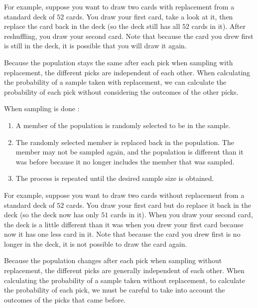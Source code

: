 \documentclass[letterpaper,10pt,english]{jupyterBook}
\begin{document}
\sphinxAtStartPar
For example, suppose you want to draw two cards with replacement from a standard deck of \(52\) cards. You draw your first card, take a look at it, then replace the card back in the deck (so the deck still has all \(52\) cards in it). After reshuffling, you draw your second card. Note that because the card you drew first is still in the deck, it is possible that you will draw it again.

\sphinxAtStartPar
Because the population stays the same after each pick when sampling with replacement, the different picks are independent of each other. When calculating the probability of a sample taken with replacement, we can calculate the probability of each pick without considering the outcomes of the other picks.

\sphinxAtStartPar
When sampling is done :
\begin{enumerate}
%
\item {} 
\sphinxAtStartPar
A member of the population is randomly selected to be in the sample.

\item {} 
\sphinxAtStartPar
The randomly selected member is  replaced back in the population. The member may not be sampled again, and the population is different than it was before because it no longer includes the member that was sampled.

\item {} 
\sphinxAtStartPar
The process is repeated until the desired sample size is obtained.

\end{enumerate}

\sphinxAtStartPar
For example, suppose you want to draw two cards without replacement from a standard deck of \(52\) cards. You draw your first card but do  replace it back in the deck (so the deck now has only \(51\) cards in it). When you draw your second card, the deck is a little different than it was when you drew your first card because now it has one less card in it. Note that because the card you drew first is no longer in the deck, it is not possible to draw the card again.

\sphinxAtStartPar
Because the population changes after each pick when sampling without replacement, the different picks are generally  independent of each other. When calculating the probability of a sample taken without replacement, to calculate the probability of each pick, we must be careful to take into account the outcomes of the picks that came before.
\end{document}
